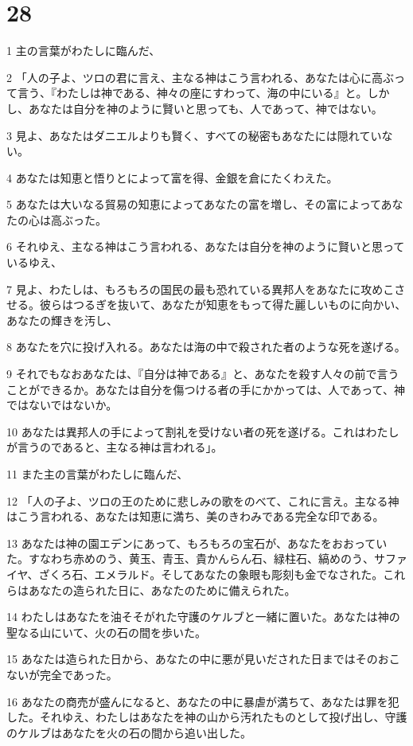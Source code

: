 \chapter{28}

\par 1 主の言葉がわたしに臨んだ、
\par 2 「人の子よ、ツロの君に言え、主なる神はこう言われる、あなたは心に高ぶって言う、『わたしは神である、神々の座にすわって、海の中にいる』と。しかし、あなたは自分を神のように賢いと思っても、人であって、神ではない。
\par 3 見よ、あなたはダニエルよりも賢く、すべての秘密もあなたには隠れていない。
\par 4 あなたは知恵と悟りとによって富を得、金銀を倉にたくわえた。
\par 5 あなたは大いなる貿易の知恵によってあなたの富を増し、その富によってあなたの心は高ぶった。
\par 6 それゆえ、主なる神はこう言われる、あなたは自分を神のように賢いと思っているゆえ、
\par 7 見よ、わたしは、もろもろの国民の最も恐れている異邦人をあなたに攻めこさせる。彼らはつるぎを抜いて、あなたが知恵をもって得た麗しいものに向かい、あなたの輝きを汚し、
\par 8 あなたを穴に投げ入れる。あなたは海の中で殺された者のような死を遂げる。
\par 9 それでもなおあなたは、『自分は神である』と、あなたを殺す人々の前で言うことができるか。あなたは自分を傷つける者の手にかかっては、人であって、神ではないではないか。
\par 10 あなたは異邦人の手によって割礼を受けない者の死を遂げる。これはわたしが言うのであると、主なる神は言われる」。
\par 11 また主の言葉がわたしに臨んだ、
\par 12 「人の子よ、ツロの王のために悲しみの歌をのべて、これに言え。主なる神はこう言われる、あなたは知恵に満ち、美のきわみである完全な印である。
\par 13 あなたは神の園エデンにあって、もろもろの宝石が、あなたをおおっていた。すなわち赤めのう、黄玉、青玉、貴かんらん石、緑柱石、縞めのう、サファイヤ、ざくろ石、エメラルド。そしてあなたの象眼も彫刻も金でなされた。これらはあなたの造られた日に、あなたのために備えられた。
\par 14 わたしはあなたを油そそがれた守護のケルブと一緒に置いた。あなたは神の聖なる山にいて、火の石の間を歩いた。
\par 15 あなたは造られた日から、あなたの中に悪が見いだされた日まではそのおこないが完全であった。
\par 16 あなたの商売が盛んになると、あなたの中に暴虐が満ちて、あなたは罪を犯した。それゆえ、わたしはあなたを神の山から汚れたものとして投げ出し、守護のケルブはあなたを火の石の間から追い出した。
